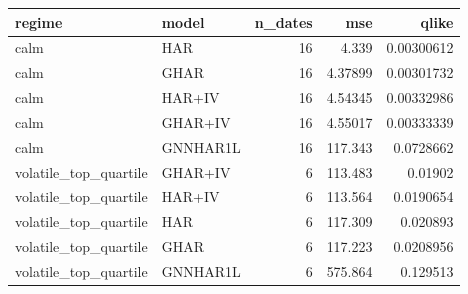 \begin{tabular}{llrrr}
\toprule
regime & model & n_dates & mse & qlike \\
\midrule
calm & HAR & 16 & 4.339 & 0.00300612 \\
calm & GHAR & 16 & 4.37899 & 0.00301732 \\
calm & HAR+IV & 16 & 4.54345 & 0.00332986 \\
calm & GHAR+IV & 16 & 4.55017 & 0.00333339 \\
calm & GNNHAR1L & 16 & 117.343 & 0.0728662 \\
volatile_top_quartile & GHAR+IV & 6 & 113.483 & 0.01902 \\
volatile_top_quartile & HAR+IV & 6 & 113.564 & 0.0190654 \\
volatile_top_quartile & HAR & 6 & 117.309 & 0.020893 \\
volatile_top_quartile & GHAR & 6 & 117.223 & 0.0208956 \\
volatile_top_quartile & GNNHAR1L & 6 & 575.864 & 0.129513 \\
\bottomrule
\end{tabular}
